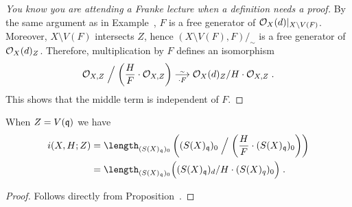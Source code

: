 \documentclass[a4paper,parskip=half,numbers=enddot, DIV=12, headheight=30pt]{scrreprt}
\begin{document}
\begin{proof}[You know you are attending a Franke lecture when a definition needs a proof]
	By the same argument as in Example~, $F$ is a free generator of $\mathcal{O}_X(d)|_{X\setminus V(F)}$. Moreover, $X\setminus V(F)$ intersects $Z$, hence $(X\setminus V(F),F)/_\sim$ is a free generator of $\mathcal{O}_X(d)_Z$. Therefore, multiplication by $F$ defines an isomorphism
	\begin{align*}
	\Oo_{X,Z} \Bigm/ \left(\frac{H}{F}\cdot\Oo_{X,Z}\right) \isomorphism[\cdot F] \Oo_X(d)_Z/H\cdot \Oo_{X,Z}\;.
	\end{align*}
	This shows that the middle term is independent of $F$.
\end{proof}
\begin{cor}
        When $Z = V(\mathfrak{q})$ we have
        \begin{align*}
            i(X,H;Z) &= \length_{(S(X)_\qq)_0}\left((S(X)_\qq)_0\Bigm/ \left(\frac{H}{F}\cdot(S(X)_\qq)_0\right)\right) \\
            &= \length_{(S(X)_\qq)_0}\Big((S(X)_\qq)_d/H\cdot (S(X)_q)_0\Big)\;.
        \end{align*}
\end{cor}
\begin{proof}
	Follows directly from Proposition~.
\end{proof}
\end{document}
